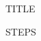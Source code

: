 
\begin{frame}{{{TITLE}}}
    \begin{enumerate}
        {{STEPS}}
    \end{enumerate}
\end{frame}



